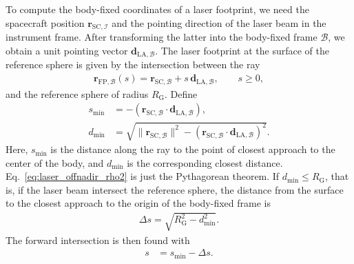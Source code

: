 \documentclass[pdflatex,sn-mathphys-num]{sn-jnl}%
\theoremstyle{thmstyleone}%
\theoremstyle{thmstyletwo}%
\theoremstyle{thmstylethree}%
\renewcommand{\vec}[1]{\boldsymbol{#1}}
\begin{document}
To compute the body-fixed coordinates of a laser footprint, we need the spacecraft position $\vec{r}_{\mathrm{SC},\mathcal{I}}$ and the pointing direction of the laser beam in the instrument frame. After transforming the latter into the body-fixed frame $\mathcal{B}$, we obtain a unit pointing vector $\vec{d}_{\mathrm{LA},\mathcal{B}}$. The laser footprint at the surface of the reference sphere is given by the intersection between the ray
\begin{align}\label{eq:def_rLA_offnadir}
    \vec{r}_{\mathrm{FP},\mathcal{B}}(s) = \vec{r}_{\mathrm{SC},\mathcal{B}} + s\,\vec{d}_{\mathrm{LA},\mathcal{B}}, \qquad s \ge 0,
\end{align}
and the reference sphere of radius $R_{\mathrm{G}}$. 
%
Define
\begin{align}
    s_{\mathrm{min}} &= - \left(\vec{r}_{\mathrm{SC},\mathcal{B}} \cdot \vec{d}_{\mathrm{LA},\mathcal{B}}\right), \\
    d_{\mathrm{min}} &=
	\sqrt{
	\|\vec{r}_{\mathrm{SC},\mathcal{B}}\|^{2}
	- \left(\vec{r}_{\mathrm{SC},\mathcal{B}} \cdot \vec{d}_{\mathrm{LA},\mathcal{B}}\right)^{2}
	}.
	\label{eq:laser_offnadir_rho2}
\end{align}
Here, $s_{\mathrm{min}}$ is the distance along the ray to the point of closest approach to the center of the body, and $d_{\mathrm{min}}$ is the corresponding closest distance. Eq.~\eqref{eq:laser_offnadir_rho2} is just the Pythagorean theorem.
If ${d_{\mathrm{min}} \le R_{\mathrm{G}}}$, that is, if the laser beam intersect the reference sphere, the distance from the surface to the closest approach to the origin of the body-fixed frame is
\begin{align}
    \Delta s = \sqrt{R_{\mathrm{G}}^{2} - d_{\mathrm{min}}^{2}}.
\end{align}
The forward intersection is then found with
\begin{align}\label{eq:def_c_min_delta}
    s &= s_{\mathrm{min}} - \Delta s. 
\end{align}
%
\end{document}
